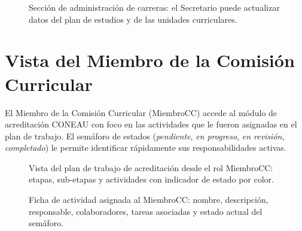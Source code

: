 \begin{figure}[H]
  \centering
  \caption[Gestión de carreras por el Secretario.]{Sección de administración
    de carreras: el Secretario puede actualizar datos del plan de estudios
    y de las unidades curriculares.}
  \label{fig:cap_sec_carreras}
\end{figure}

\section{Vista del Miembro de la Comisión Curricular}
\label{anexo:vista_cc}

El Miembro de la Comisión Curricular (MiembroCC) accede al módulo de
acreditación CONEAU con foco en las actividades que le fueron asignadas
en el plan de trabajo. El semáforo de estados (\textit{pendiente},
\textit{en progreso}, \textit{en revisión}, \textit{completado}) le
permite identificar rápidamente sus responsabilidades activas.

\begin{figure}[H]
  \centering
  \caption[Panel de acreditación del Miembro de la Comisión Curricular.]{Vista
    del plan de trabajo de acreditación desde el rol MiembroCC: etapas,
    sub-etapas y actividades con indicador de estado por color.}
  \label{fig:cap_cc_panel}
\end{figure}

\begin{figure}[H]
  \centering
  \caption[Detalle de actividad en el plan de trabajo.]{Ficha de actividad
    asignada al MiembroCC: nombre, descripción, responsable, colaboradores,
    tareas asociadas y estado actual del semáforo.}
  \label{fig:cap_cc_actividad}
\end{figure}

